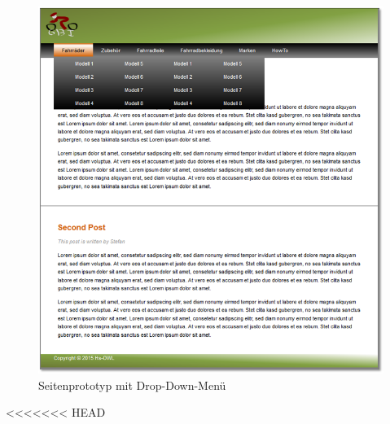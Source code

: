 \begin{figure}[H]
\begin{center}
\includegraphics[width=150mm]{Bilder/Abbildung4-SeitenprototypMitDropDownMenue.png}
\end{center}
\caption{Seitenprototyp mit Drop-Down-Menü}
\end{figure}



<<<<<<< HEAD

